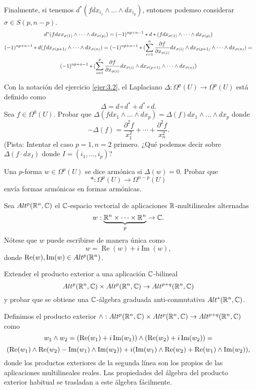 \documentclass[twoside]{article}
\begin{document}
\begin{solucion}
Finalmente, si tenemos $d^*(fdx_{i_1}\land\dots\land dx_{i_p})$, entonces podemso considerar $\sigma\in S(p,n-p)$.
\begin{gather*}
d^*(fdxx_{\sigma(1)}\land\dots\land dx_{\sigma(p)})=(-1)^{np+n-1}*d*(f dx_{\sigma(1)}\land\dots\land dx_{\sigma(p)})\\
(-1)^{np+n-1}*d(fdx_{\sigma(p+1)}\land\dots\land dx_{\sigma(n)})=(-1)^{np+n-1}*(\sum_{i=1}^n\frac{\partial f}{\partial x_{\sigma(i)}}dx_{\sigma(i)}\land dx_{\sigma(p+1)}\land\dots\land dx_{\sigma(n)})=\\
(-1)^{np+n-1}*(\sum_{i=1}^p\frac{\partial f}{\partial x_{\sigma(i)}}dx_{\sigma(i)}\land dx_{\sigma(p+1)}\land\dots\land dx_{\sigma(n)})
\end{gather*}

\end{solucion}
\newpage

\begin{ejercicio}{3.3}
Con la notación del ejercicio \ref{ejer:3.2}, el Laplaciano $\Delta:\Omega^p(U)\to\Omega^p(U)$ está definido como
\[
\Delta=d\circ d^*+d^*\circ d.
\]
Sea $f\in\Omega^0(U)$. Probar que $\Delta(f dx_1\land\dots\land dx_p)=\Delta(f)dx_1\land\dots\land dx_p$ donde
\[
-\Delta(f)=\frac{\partial^2 f}{x_1^2}+\cdots+\frac{\partial^2 f}{x_n^2}.
\]
(Pista: Intentar el caso $p=1,n=2$ primero. ¿Qué podemos decir sobre $\Delta(f\cdot dx_I)$ donde $I=(i_1,\dots, i_p)$?

Una $p$-forma $w\in\Omega^p(U)$ se dice armónica si $\Delta(w)=0$. Probar que
\[
*:\Omega^p(U)\to \Omega^{n-p}(U)
\]
envía formas armónicas en formas armónicas.
\end{ejercicio}
\begin{solucion}
\end{solucion}
\newpage

\begin{ejercicio}{3.4}
Sea $Alt^p(\mathbb{R}^n,\mathbb{C})$ el $\mathbb{C}$-espacio vectorial de aplicaciones $\mathbb{R}$-multilineales alternadas 
\[
w:\underbrace{\mathbb{R}^n\times\dots\times\mathbb{R}^n}_{p}\to\mathbb{C}.
\]
Nótese que $w$ puede escribirse de manera única como
\[
w=\operatorname{Re}(w)+i\operatorname{Im}(w),
\]
donde $\operatorname{Re}(w),\operatorname{Im}(w)\in Alt^p(\mathbb{R}^n)$.

Extender el producto exterior a una aplicación $\mathbb{C}$-bilineal 
\[
Alt^p(\mathbb{R}^n,\mathbb{C})\times Alt^p(\mathbb{R}^n,\mathbb{C})\to Alt^{p+q}(\mathbb{R}^n,\mathbb{C})
\]
y probar que se obtiene una $\mathbb{C}$-álgebra graduada anti-conmutativa $Alt^*(\mathbb{R}^n,\mathbb{C})$.
\end{ejercicio}
\begin{solucion}
Definimos el producto exterior $\land: Alt^p(\mathbb{R}^n,\mathbb{C})\times Alt^p(\mathbb{R}^n,\mathbb{C})\to Alt^{p+q}(\mathbb{R}^n,\mathbb{C})$ como 
\[
w_1\land w_2=(\operatorname{Re}(w_1)+i\operatorname{Im}(w_1))\land(\operatorname{Re}(w_2)+i\operatorname{Im}(w_2))=
\]
\[
(\operatorname{Re}(w_1)\land\operatorname{Re}(w_2)-\operatorname{Im}(w_1)\land\operatorname{Im}(w_2))+i(\operatorname{Im}(w_1)\land\operatorname{Re}(w_2)+\operatorname{Re}(w_1)\land\operatorname{Im}(w_2)),
\]
donde los productos exteriores de la segunda línea son los propios de las aplicaciones multilineales reales. Las propiedades del álgebra del producto exterior habitual se trasladan a este álgebra fácilmente.
\end{solucion}
\end{document}
